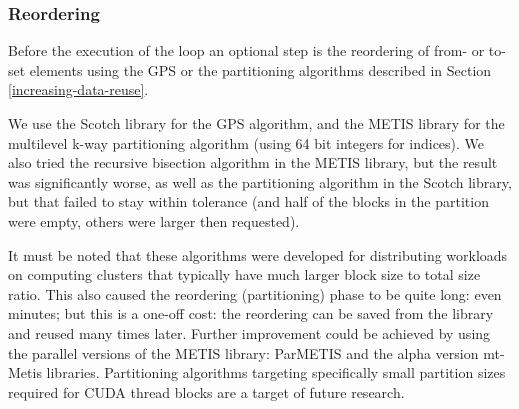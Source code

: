 \subsubsection{Reordering}

Before the execution of the loop an optional step is the reordering of from- or
to-set elements using the GPS or the partitioning algorithms described in
Section \ref{increasing-data-reuse}.

We use the Scotch library\cite{scotch} for the GPS algorithm, and the
METIS\cite{metis} library for the multilevel k-way partitioning algorithm (using
64 bit integers for indices). We also tried the recursive bisection algorithm in
the METIS library, but the result was significantly worse, as well as the
partitioning algorithm in the Scotch library, but that failed to stay within
tolerance (and half of the blocks in the partition were empty, others were
larger then requested).

It must be noted that these algorithms were developed for distributing workloads
on computing clusters that typically have much larger block size to total size
ratio. This also caused the reordering (partitioning) phase to be quite long:
even minutes; but this is a one-off cost: the reordering can be saved from the
library and reused many times later. Further improvement could be achieved by
using the parallel versions of the METIS library: ParMETIS\cite{parmetis} and
the alpha version mt-Metis\cite{mtmetis} libraries. Partitioning algorithms
targeting specifically small partition sizes required for CUDA thread blocks are
a target of future research.

